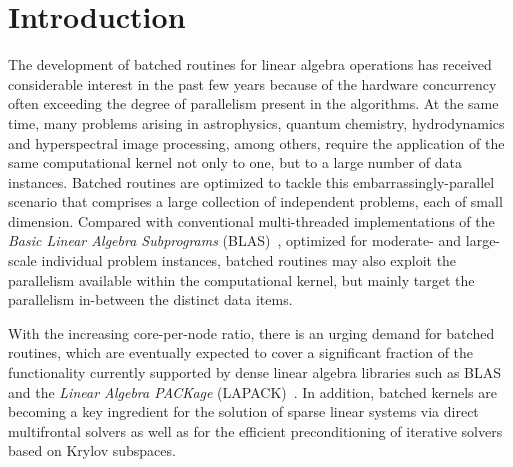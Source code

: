 \section{Introduction}

The development of batched routines for linear algebra operations has received considerable interest in the past few
years because of the hardware concurrency often exceeding the degree of parallelism present in the algorithms. 
At the same time, many problems arising
in
astrophysics, quantum chemistry, hydrodynamics and hyperspectral image processing, among others, 
require the application of the same computational kernel not only to one, 
but to a large number of data instances.
Batched routines are optimized to tackle this embarrassingly-parallel 
scenario that comprises a large collection of independent problems,
each of small dimension.
Compared with conventional multi-threaded implementations of 
the {\em Basic Linear Algebra Subprograms} (BLAS)~\cite{blas}, 
optimized for moderate- and large-scale individual problem instances,
batched routines may also exploit the parallelism available within the 
computational kernel, but mainly target the parallelism in-between the
distinct data items.

With the increasing core-per-node ratio, there is an urging demand for batched 
routines, which are eventually expected to cover a 
significant fraction of the functionality currently supported by dense linear algebra libraries such
as BLAS and the {\em Linear Algebra PACKage} (LAPACK)~\cite{lapack}. In addition, 
batched kernels are becoming a key ingredient for the solution of sparse linear systems 
via direct multifrontal solvers
as well as for the efficient preconditioning of iterative solvers based on Krylov subspaces.

